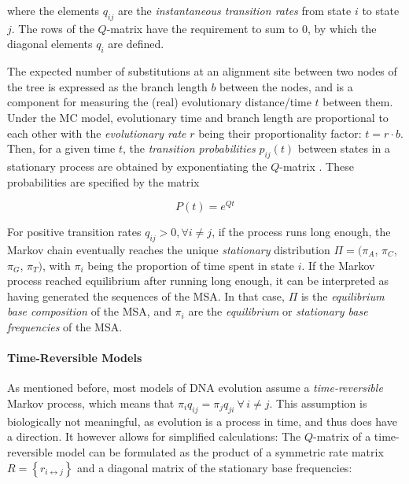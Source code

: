 where the elements $q_{ij}$ are the \emph{instantaneous transition rates} from state $i$ to state $j$.
The rows of the $Q$-matrix have the requirement to sum to $0$,
by which the diagonal elements $q_{i}$ are defined.

The expected number of substitutions at an alignment site between two nodes of the tree
is expressed as the branch length $b$ between the nodes,
and is a component for measuring the (real) evolutionary distance/time $t$ between them.
Under the MC model, evolutionary time and branch length are proportional to each other
with the \emph{evolutionary rate} $r$ being their proportionality factor: $t = r \cdot b$.
Then, for a given time $t$, the \emph{transition probabilities} $p_{ij}(t)$ between states in a stationary process
are obtained by exponentiating the $Q$-matrix \cite{Yang2014}.
These probabilities are specified by the matrix

\begin{equation}
    \label{ch:Foundations:sec:MLTreeInference:eq:P_matrix}
    P(t) = e^{Qt}
\end{equation}

For positive transition rates $q_{ij} > 0, \forall i \neq j$, if the process runs long enough,
the Markov chain eventually reaches the unique \emph{stationary} distribution $\Pi = (\pi_A$, $\pi_C$, $\pi_G$, $\pi_T )$,
with $\pi_i$ being the proportion of time spent in state $i$.
If the Markov process reached equilibrium after running long enough,
it can be interpreted as having generated the sequences of the MSA.
In that case, $\Pi$ is the \emph{equilibrium base composition} of the MSA,
and $\pi_i$ are the \emph{equilibrium} or \emph{stationary base frequencies} of the MSA.

\paragraph{Time-Reversible Models}
\label{ch:Foundations:sec:MLTreeInference:sub:ModelsOfSeqEvol:par:TimeReversibleModels}

As mentioned before, most models of DNA evolution assume a \emph{time-reversible} Markov process,
which means that $\pi_{i} q_{ij} = \pi_{j} q_{ji} ~ \forall \, i \neq j$.
This assumption is biologically not meaningful, as evolution is a process in time, and thus does have a direction.
It however allows for simplified calculations:
The $Q$-matrix of a time-reversible model can be formulated as the product of
a symmetric rate matrix $R = \left\{ r_{i \leftrightarrow j} \right\}$ and
a diagonal matrix of the stationary base frequencies:

